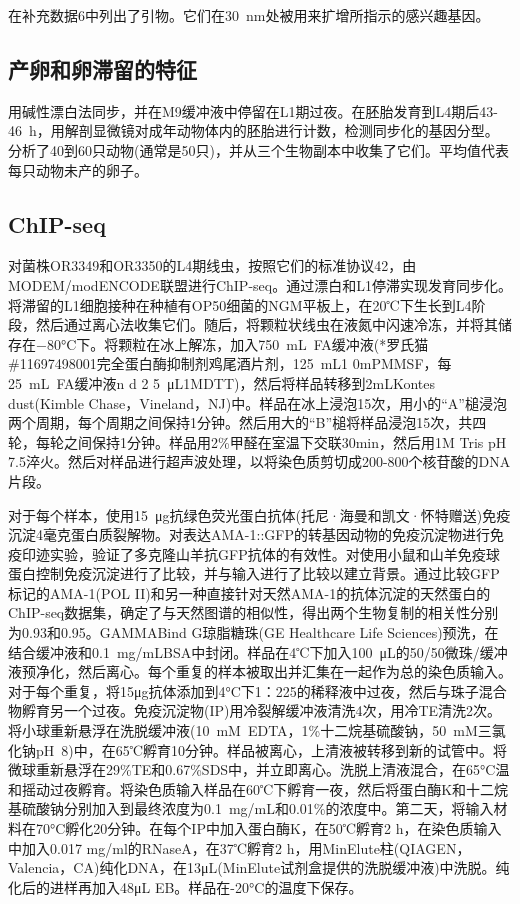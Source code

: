 \documentclass{ctexart}
\begin{document}
        在补充数据6中列出了引物。它们在30~nm处被用来扩增所指示的感兴趣基因。

    \subsection{产卵和卵滞留的特征}

        用碱性漂白法同步，并在M9缓冲液中停留在L1期过夜。在胚胎发育到L4期后43-46~h，用解剖显微镜对成年动物体内的胚胎进行计数，检测同步化的基因分型。分析了40到60只动物(通常是50只)，并从三个生物副本中收集了它们。平均值代表每只动物未产的卵子。

    \subsection{ChIP-seq}

        对菌株OR3349和OR3350的L4期线虫，按照它们的标准协议42，由MODEM/modENCODE联盟进行ChIP-seq。通过漂白和L1停滞实现发育同步化。将滞留的L1细胞接种在种植有OP50细菌的NGM平板上，在20℃下生长到L4阶段，然后通过离心法收集它们。随后，将颗粒状线虫在液氮中闪速冷冻，并将其储存在−80°C下。将颗粒在冰上解冻，加入750~mL~FA缓冲液(*罗氏猫\#11697498001完全蛋白酶抑制剂鸡尾酒片剂，125~mL1 0mPMMSF，每25~mL~FA缓冲液n d 2 5~μL1MDTT)，然后将样品转移到2mLKontes dust(Kimble Chase，Vineland，NJ)中。样品在冰上浸泡15次，用小的“A”槌浸泡两个周期，每个周期之间保持1分钟。然后用大的“B”槌将样品浸泡15次，共四轮，每轮之间保持1分钟。样品用2\%甲醛在室温下交联30min，然后用1M Tris pH 7.5淬火。然后对样品进行超声波处理，以将染色质剪切成200-800个核苷酸的DNA片段。

        对于每个样本，使用15~μg抗绿色荧光蛋白抗体(托尼·海曼和凯文·怀特赠送)免疫沉淀4毫克蛋白质裂解物。对表达AMA-1::GFP的转基因动物的免疫沉淀物进行免疫印迹实验，验证了多克隆山羊抗GFP抗体的有效性。对使用小鼠和山羊免疫球蛋白控制免疫沉淀进行了比较，并与输入进行了比较以建立背景。通过比较GFP标记的AMA-1(POL II)和另一种直接针对天然AMA-1的抗体沉淀的天然蛋白的ChIP-seq数据集，确定了与天然图谱的相似性，得出两个生物复制的相关性分别为0.93和0.95。GAMMABind G琼脂糖珠(GE Healthcare Life Sciences)预洗，在结合缓冲液和0.1~mg/mLBSA中封闭。样品在4℃下加入100~μL的50/50微珠/缓冲液预净化，然后离心。每个重复的样本被取出并汇集在一起作为总的染色质输入。对于每个重复，将15μg抗体添加到4°C下1：225的稀释液中过夜，然后与珠子混合物孵育另一个过夜。免疫沉淀物(IP)用冷裂解缓冲液清洗4次，用冷TE清洗2次。将小球重新悬浮在洗脱缓冲液(10~mM~EDTA，1\%十二烷基硫酸钠，50~mM三氯化钠pH~8)中，在65℃孵育10分钟。样品被离心，上清液被转移到新的试管中。将微球重新悬浮在29\%TE和0.67\%SDS中，并立即离心。洗脱上清液混合，在65°C温和摇动过夜孵育。将染色质输入样品在60℃下孵育一夜，然后将蛋白酶K和十二烷基硫酸钠分别加入到最终浓度为0.1~mg/mL和0.01\%的浓度中。第二天，将输入材料在70°C孵化20分钟。在每个IP中加入蛋白酶K，在50℃孵育2 h，在染色质输入中加入0.017 mg/ml的RNaseA，在37℃孵育2 h，用MinElute柱(QIAGEN，Valencia，CA)纯化DNA，在13μL(MinElute试剂盒提供的洗脱缓冲液)中洗脱。纯化后的进样再加入48μL EB。样品在-20°C的温度下保存。
\end{document}

